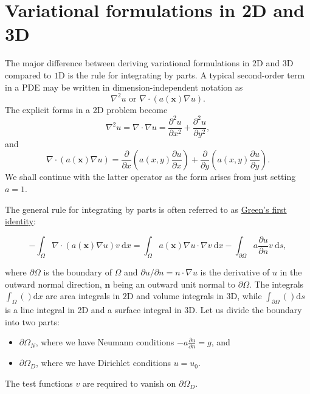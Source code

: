 \documentclass[../main.tex]{subfiles}
\begin{document}
	
\chapter{Variational formulations in 2D and 3D}
\label{chap:chap_17}
	\noindent The major difference between deriving variational formulations in $2 \mathrm{D}$ and $3 \mathrm{D}$ compared to $1 \mathrm{D}$ is the rule for integrating by parts. A typical second-order term in a PDE may be written in dimension-independent notation as
	$$
	\nabla^{2} u \text { or } \nabla \cdot(a(\boldsymbol{x}) \nabla u) .
	$$
	The explicit forms in a 2D problem become
	$$
	\nabla^{2} u=\nabla \cdot \nabla u=\frac{\partial^{2} u}{\partial x^{2}}+\frac{\partial^{2} u}{\partial y^{2}},
	$$
	and
	$$
	\nabla \cdot(a(\boldsymbol{x}) \nabla u)=\frac{\partial}{\partial x}\left(a(x, y) \frac{\partial u}{\partial x}\right)+\frac{\partial}{\partial y}\left(a(x, y) \frac{\partial u}{\partial y}\right) .
	$$
	We shall continue with the latter operator as the form arises from just setting $a=1$.
	
	The general rule for integrating by parts is often referred to as \href{https://en.wikipedia.org/wiki/Green's_identities}{Green's first identity}:
	
	\begin{equation}
		\label{eqa197}
		-\int_{\Omega} \nabla \cdot(a(\boldsymbol{x}) \nabla u) v \mathrm{~d} x=\int_{\Omega} a(\boldsymbol{x}) \nabla u \cdot \nabla v \mathrm{~d} x-\int_{\partial \Omega} a \frac{\partial u}{\partial n} v \mathrm{~d} s,
	\end{equation}

	where $\partial \Omega$ is the boundary of $\Omega$ and $\partial u / \partial n=n \cdot \nabla u$ is the derivative of $u$ in the outward normal direction, $\boldsymbol{n}$ being an outward unit normal to $\partial \Omega$. The integrals $\int_{\Omega}() \mathrm{d} x$ are area integrals in $2 \mathrm{D}$ and volume integrals in $3 \mathrm{D}$, while $\int_{\partial \Omega}() \mathrm{d} s$ is a line integral in 2D and a surface integral in 3D. \smallbreak
	Let us divide the boundary into two parts:
	\begin{itemize}
		\item $\partial \Omega_{N}$, where we have Neumann conditions $-a \frac{\partial u}{\partial n}=g$, and
		\item $\partial \Omega_{D}$, where we have Dirichlet conditions $u=u_{0}$.
	\end{itemize} \smallbreak
	\noindent The test functions $v$ are required to vanish on $\partial \Omega_{D}$.
	
\end{document}
